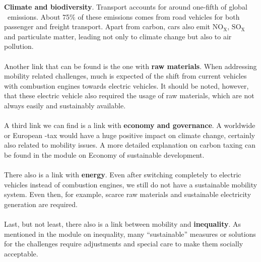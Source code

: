 \documentclass[../summary.tex]{subfiles}
\begin{document}
\textbf{Climate and biodiversity}. Transport accounts for around one-fifth of global \COtwo\ emissions. About 75\% of these emissions comes from road vehicles for both passenger and freight transport. Apart from carbon, cars also emit $\mathrm{NO_{X}}$, $\mathrm{SO_{X}}$ and particulate matter, leading not only to climate change but also to air pollution.
\\\\
Another link that can be found is the one with \textbf{raw materials}. When addressing mobility related challenges, much is expected of the shift from current vehicles with combustion engines towards electric vehicles. It should be noted, however, that these electric vehicle also required the usage of raw materials, which are not always easily and sustainably available.
\\\\
A third link we can find is a link with \textbf{economy and governance}. A worldwide or European \COtwo-tax would have a huge positive impact on climate change, certainly also related to mobility issues. A more detailed explanation on carbon taxing can be found in the module on Economy of sustainable development.
\\\\
There also is a link with \textbf{energy}. Even after switching completely to electric vehicles instead of combustion engines, we still do not have a sustainable mobility system. Even then, for example, scarce raw materials and sustainable electricity generation are required.
\\\\
Last, but not least, there also is a link between mobility and \textbf{inequality}. As mentioned in the module on inequality, many “sustainable” measures or solutions for the challenges require adjustments and special care to make them socially acceptable.
\end{document}
